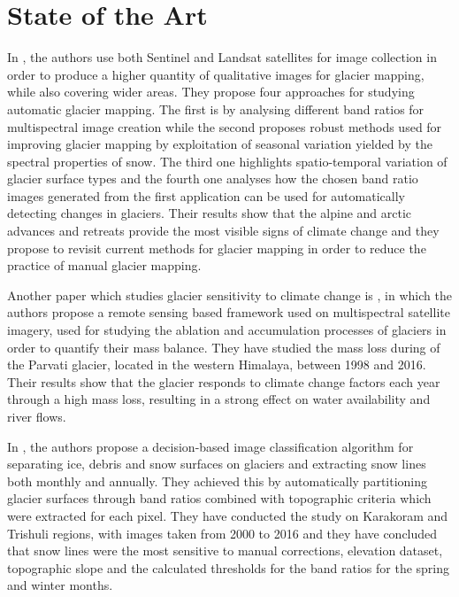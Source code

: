 \documentclass[12pt, a4paper]{report}
\begin{document}
	\section{State of the Art}
	
	\par In \cite{WINSVOLD2016}, the authors use both Sentinel and Landsat satellites for image collection in order to produce a higher quantity of qualitative images for glacier mapping, while also covering wider areas. They propose four approaches for studying automatic glacier mapping. The first is by analysing different band ratios for multispectral image creation while the second proposes robust methods used for improving glacier mapping by exploitation of seasonal variation yielded by the spectral properties of snow. The third one highlights spatio-temporal variation of glacier surface types and the fourth one analyses how the chosen band ratio images generated from the first application can be used for automatically detecting changes in glaciers. Their results show that the alpine and arctic advances and retreats provide the most visible signs of climate change and they propose to revisit current methods for glacier mapping in order to reduce the practice of manual glacier mapping.
	
	Another paper which studies glacier sensitivity to climate change is \cite{TAK2020}, in which the authors propose a remote sensing based framework used on multispectral satellite imagery, used for studying the ablation and accumulation processes of glaciers in order to quantify their mass balance. They have studied the mass loss during of the Parvati glacier, located in the western Himalaya, between 1998 and 2016. Their results show that the glacier responds to climate change factors each year through a high mass loss, resulting in a strong effect on water availability and river flows.
	
	In \cite{RACOVITEANU2019}, the authors propose a decision-based image classification algorithm for separating ice, debris and snow surfaces on glaciers and extracting snow lines both monthly and annually. They achieved this by automatically partitioning glacier surfaces through band ratios combined with topographic criteria which were extracted for each pixel. They have conducted the study on Karakoram and Trishuli regions, with images taken from 2000 to 2016 and they have concluded that snow lines were the most sensitive to manual corrections, elevation dataset, topographic slope and the calculated thresholds for the band ratios for the spring and winter months.
	
\end{document}
